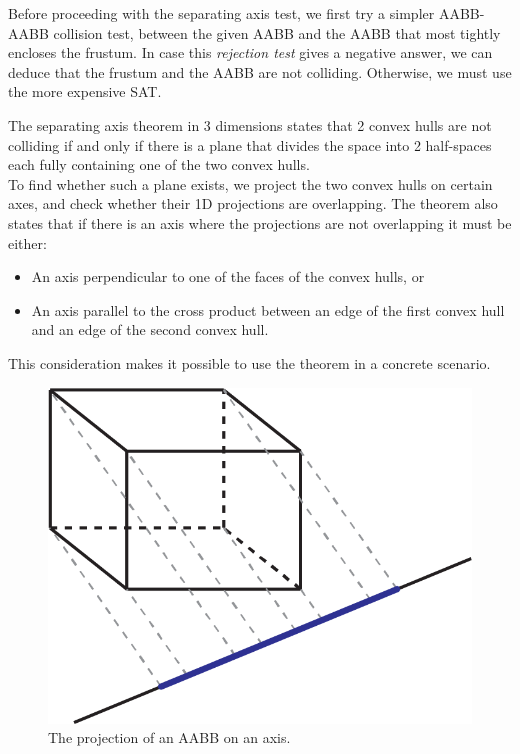 \documentclass{PoliMi_MasterThesis}
\begin{document}
Before proceeding with the separating axis test, we first try a simpler AABB-AABB collision test, between the given AABB and the AABB that most tightly encloses the frustum. In case this \textit{rejection test} gives a negative answer, we can deduce that the frustum and the AABB are not colliding. Otherwise, we must use the more expensive SAT.

The separating axis theorem in 3 dimensions states that 2 convex hulls are not colliding if and only if there is a plane that divides the space into 2 half-spaces each fully containing one of the two convex hulls.\\
To find whether such a plane exists, we project the two convex hulls on certain axes, and check whether their 1D projections are overlapping. The theorem also states that if there is an axis where the projections are not overlapping it must be either:
\begin{itemize}
	\item An axis perpendicular to one of the faces of the convex hulls, or
	\item An axis parallel to the cross product between an edge of the first convex hull and an edge of the second convex hull.
\end{itemize}
This consideration makes it possible to use the theorem in a concrete scenario.

\begin{figure}[H]
    \centering
    \includegraphics[scale=0.35]{Images/aabb_1d_proj.png} 
    \caption{The projection of an AABB on an axis.}
    \label{fig:aabb_1d_proj}
\end{figure}
\end{document}
